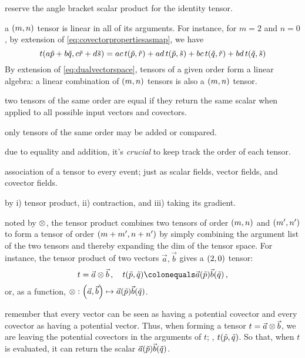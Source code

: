  reserve the angle bracket scalar product for the identity tensor.

 a $\torder mn$ tensor is linear in all of its arguments. For instance, for $m = 2$ and $n = 0$, by extension of \cref{eq:covectorpropertiesasmap}, we have
%
\begin{equation}\label{eq:linearityoftensors}
  t\vat{a\cov p + b\cov q, c\cov r + d\cov s} = ac\,t\vat{\cov p, \cov r} 
                                              + ad\,t\vat{\cov p, \cov s} 
                                              + bc\,t\vat{\cov q, \cov r} 
                                              + bd\,t\vat{\cov q, \cov s}
\end{equation}
%
By extension of \cref{eq:dualvectorspace}, tensors of a given order form a linear algebra: a linear combination of $\torder mn$ tensors is also a $\torder mn$ tensor.

 two tensors of the same order are equal if they return the same scalar when applied to all possible input vectors and covectors.

 only tensors of the same order may be added or compared.

 due to equality and addition, it's \emph{crucial} to keep track the order of each tensor.

 association of a tensor to every event; just as scalar fields, vector fields, and covector fields.

 by i) tensor product, ii) contraction, and iii) taking its gradient.

 noted by $\otimes$, the tensor product combines two tensors of order $\torder mn$ and $\torder{m'}{n'}$ to form a tensor of order $\torder{m + m'}{n + n'}$ by simply combining the argument list of the two tensors and thereby expanding the dim of the tensor space. For instance, the tensor product of two vectors $\vec a,\vec b$ gives a $\torder 20$ tensor:
%
\begin{equation}\label{eq:vectorvectortensorproduct}
  t = \vec a\tprod\vec b\,,\quad t\vat{\cov p, \cov q} \defas \vec a\vat{\cov p}\vec b\vat{\cov q}\,,
\end{equation}
%
or, as a function, $\tprod:\fmap{\tuple{\vec a,\vec b}}{\vec a\vat{\cov p}\vec b\vat{\cov q}}$. 

 remember that every vector can be seen as having a potential covector and every covector as having a potential vector. Thus, when forming a tensor $t = \vec a\otimes\vec b$, we are leaving the potential covectors in the arguments of $t$; \ie, $t\vat{\cov p,\cov q}$. So that, when $t$ is evaluated, it can return the scalar $\vec a\vat{\cov p}\vec b\vat{\cov q}$.

